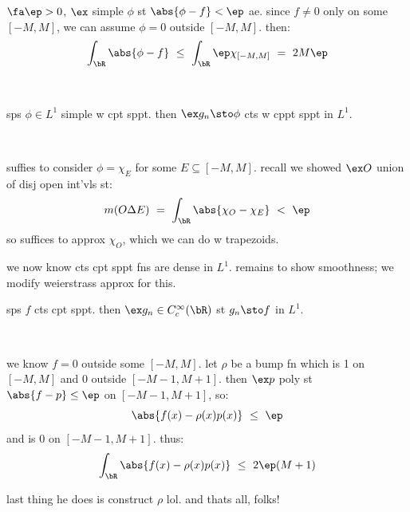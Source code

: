 \begin{pf}
	$\fa\ep>0$, $\ex$ simple $\phi$ st $\abs{\phi-f}<\ep$ ae.
	since $f\neq0$ only on some $[-M,M]$, we can assume $\phi=0$ outside $[-M,M]$. then: \vspace{-0.15in}
	\begin{equation*}
		\int_{\bR}\abs{\phi-f} \ \leq \ \int_{\bR}\ep\chi_{[-M,M]} \ = \ 2M\ep
	\end{equation*} \vspace{-0.15in}
\end{pf} \

\begin{lm}
	sps $\phi\in L^{1}$ simple w cpt sppt.
	then $\ex g_{n}\sto\phi$ cts w cppt sppt in $L^{1}$.
\end{lm} \

\begin{pf}
	suffies to consider $\phi=\chi_{E}$ for some $E\subseteq[-M,M]$.
	recall we showed $\ex O$ union of disj open int'vls st:
	\begin{equation*}
		m(O\Delta E) \ = \ \int_{\bR}\abs{\chi_{O}-\chi_{E}} \ < \ \ep
	\end{equation*}
	so suffices to approx $\chi_{O}$, which we can do w trapezoids.
\end{pf}

we now know cts cpt sppt fns are dense in $L^{1}$.
remains to show smoothness; we modify weierstrass approx for this.

\begin{lm}
	sps $f$ cts cpt sppt.
	then $\ex g_{n}\in C^{\infty}_{c}(\bR)$ st $g_{n}\sto f$ in $L^{1}$.
\end{lm} \

\begin{pf}
	we know $f=0$ outside some $[-M,M]$.
	let $\rho$ be a bump fn which is 1 on $[-M,M]$ and $0$ outside $[-M-1,M+1]$.
	then $\ex p$ poly st $\abs{f-p} \leq \ep$ on $[-M-1,M+1]$, so:
	\begin{equation*}
		\abs{f(x)-\rho(x)p(x)} \ \leq \ \ep
	\end{equation*}
	and is 0 on $[-M-1,M+1]$. thus:
	\begin{equation*}
		\int_{\bR}\abs{f(x)-\rho(x)p(x)} \ \leq \ 2\ep(M+1)
	\end{equation*}
\end{pf}

last thing he does is construct $\rho$ lol. and thats all, folks!
